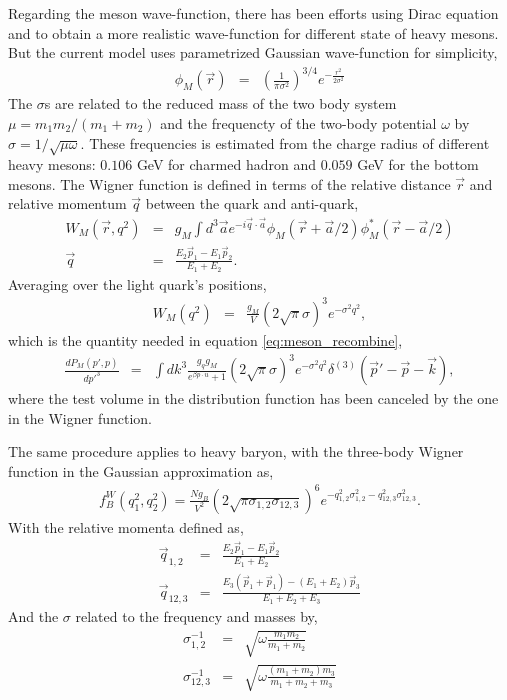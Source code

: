 Regarding the meson wave-function, there has been efforts using Dirac equation and to obtain a more realistic wave-function for different state of heavy mesons.
But the current model uses parametrized Gaussian wave-function for simplicity,
\begin{eqnarray}
\phi_M(\vec{r}) &=& \left(\frac{1}{\pi \sigma^2}\right)^{3/4} e^{-\frac{r^2}{2\sigma^2}}
\end{eqnarray}
The $\sigma$s are related to the reduced mass of the two body system $\mu = m_1 m_2/(m_1+m_2)$ and the frequencty of the  two-body potential $\omega$ by $\sigma = 1/\sqrt{\mu \omega}$.
These frequencies is estimated from the charge radius of different heavy mesons: $0.106$ GeV for charmed hadron and $0.059$ GeV for the bottom mesons.
The Wigner function is defined in terms of the relative distance $\vec{r}$ and relative momentum $\vec{q}$ between the quark and anti-quark,
\begin{eqnarray}
W_M(\vec{r}, q^2) &=& g_M \int d^3 \vec{a} e^{-i\vec{q}\cdot \vec{a}} \phi_M(\vec{r}+\vec{a}/2) \phi_M^*(\vec{r}-\vec{a}/2) \\
\vec{q} &=& \frac{E_2\vec{p}_1 - E_1\vec{p}_2}{E_1+E_2}.
\end{eqnarray} 
Averaging over the light quark's positions,
\begin{eqnarray}
W_M(q^2) &=& \frac{g_M}{V} (2\sqrt{\pi}\sigma)^3 e^{-\sigma^2 q^2},
\end{eqnarray}
which is the quantity needed in equation \ref{eq:meson_recombine},
\begin{eqnarray}
\frac{dP_M(p',p)}{dp'^3} &=& \int dk^3 \frac{g_q g_M}{e^{\beta p\cdot u} + 1} (2\sqrt{\pi}\sigma)^3 e^{-\sigma^2 q^2} \delta^{(3)}(\vec{p}'-\vec{p}-\vec{k}),
\end{eqnarray}
where the test volume in the distribution function has been canceled by the one in the Wigner function.

The same procedure applies to heavy baryon, with the three-body Wigner function in the Gaussian approximation as,
\begin{eqnarray}
f_B^W(q_1^2, q_2^2) = \frac{N g_B}{V^2} (2\sqrt{\pi\sigma_{1,2}\sigma_{12,3}})^6 e^{-q_{1,2}^2 \sigma_{1,2}^2 - q_{12,3}^2 \sigma_{12,3}^2}.
\end{eqnarray}
With the relative momenta defined as,
\begin{eqnarray}
\vec{q}_{1,2} &=& \frac{E_2 \vec{p}_1 -E_1\vec{p}_2}{E_1+E_2}\\
\vec{q}_{12,3} &=& \frac{E_3 (\vec{p}_1+\vec{p}_1) - (E_1+E_2)\vec{p}_3}{E_1+E_2 + E_3}
\end{eqnarray}
And the $\sigma$ related to the frequency and masses by,
\begin{eqnarray}
\sigma_{1,2}^{-1} &=& \sqrt{\omega \frac{m_1m_2}{m_1+m_2}}\\
\sigma_{12,3}^{-1} &=& \sqrt{\omega \frac{(m_1+m_2)m_3}{m_1+m_2+m_3}}
\end{eqnarray}

